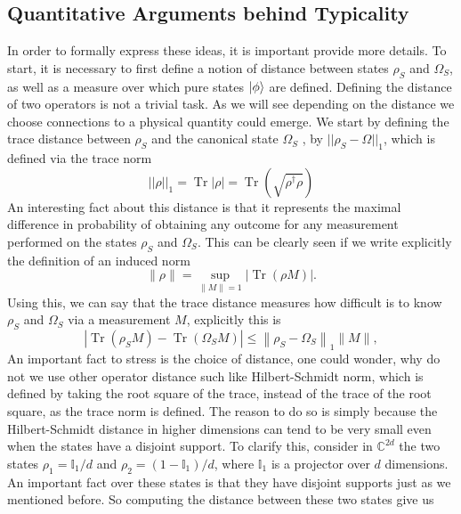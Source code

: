 \subsection{Quantitative Arguments behind Typicality}
In order to formally express these ideas, it is important provide more details. To start, it is necessary to first define a notion of distance between states $\rho_S$ and $\Omega_S$, as well as a measure over which pure states $\mathinner{|{\phi}\rangle}$ are defined.
\newline
Defining the distance of two operators is not a trivial task. As we will see depending on the distance we choose connections to a physical quantity could emerge. We start by defining the trace distance between $\rho_S$ and the canonical state $\Omega_S$ , by  $||\rho_S-\Omega||_1$, which is defined via the trace norm
\begin{equation}
||\rho||_1=\operatorname{Tr}|\rho|=\operatorname{Tr}\left(\sqrt{\rho^{\dagger} \rho}\right)
\label{CH1:Trace_distance}
\end{equation}
An interesting fact about this distance is that it represents the maximal difference in probability of obtaining any outcome for any measurement performed on the states $\rho_S$ and $\Omega_S$. This can be clearly seen if we write explicitly the definition of an induced norm
\begin{equation}
\|\rho\| = \sup_{\|M\|=1} |\operatorname{Tr}(\rho M)|.
\end{equation}
Using this, we can say that the trace distance measures how difficult is to know $\rho_S$ and $\Omega_S$ via a measurement $M$, explicitly this is
\begin{equation}
\left|\operatorname{Tr}\left(\rho_{S} M\right)-\operatorname{Tr}\left(\Omega_{S} M\right)\right| \leq\left\|\rho_{S}-\Omega_{S}\right\|_{1}\|M\|,
\label{CH1:inequality1_tipicality}
\end{equation}
An important fact to stress is the choice of distance, one could wonder, why do not we use other operator distance such like Hilbert-Schmidt norm, which is defined by taking the root square of the trace, instead of the trace of the root square, as the trace norm is defined. The reason to do so is simply because the Hilbert-Schmidt distance in higher dimensions can tend to be very small even when the states have a disjoint support\cite{facchi_quantum_2017}. To clarify this, consider in $\mathbb{C}^{2d}$ the two states $\rho_1 = \mathbb{I}_1/d$ and $\rho_2 =(1-\mathbb{I}_1)/d$, where $\mathbb{I}_1$ is a projector over $d$ dimensions. An important fact over these states is that they have disjoint supports just as we mentioned before. So computing the distance between these two states give us
